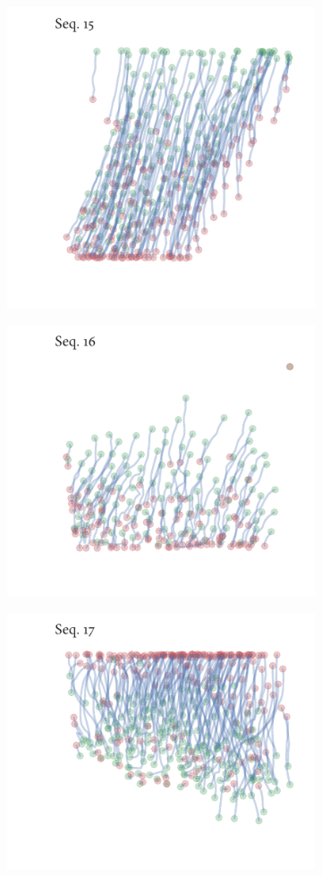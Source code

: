 \begin{figure}[h]
\begin{subfigure}[t]{0.5\textwidth}
		\includegraphics{streamline_sequence15.pdf}
	\end{subfigure}%
	\begin{subfigure}[t]{0.5\textwidth}
		\centering
		\includegraphics{streamline_sequence16.pdf}
	\end{subfigure}
	\begin{subfigure}[t]{0.5\textwidth}
		\centering
		\includegraphics{streamline_sequence17.pdf}

\end{subfigure}
\end{figure}
